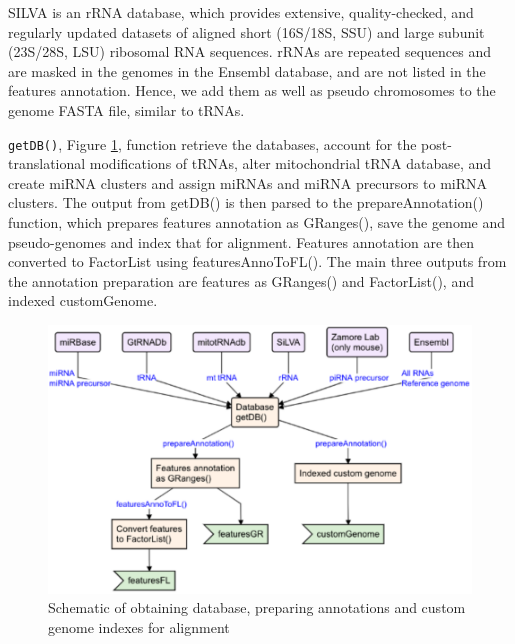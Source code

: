 \documentclass[12pt,twoside]{reedthesis}
\begin{document}
SILVA is an rRNA database, which provides extensive, quality-checked,
and regularly updated datasets of aligned short (16S/18S, SSU) and large
subunit (23S/28S, LSU) ribosomal RNA sequences. rRNAs are repeated
sequences and are masked in the genomes in the Ensembl database, and are
not listed in the features annotation. Hence, we add them as well as
pseudo chromosomes to the genome FASTA file, similar to tRNAs.

\texttt{getDB()}, Figure \ref{fig:3f6}, function retrieve the databases, account for the
post-translational modifications of tRNAs, alter mitochondrial tRNA
database, and create miRNA clusters and assign miRNAs and miRNA
precursors to miRNA clusters. The output from getDB() is then parsed to
the prepareAnnotation() function, which prepares features annotation as
GRanges(), save the genome and pseudo-genomes and index that for
alignment. Features annotation are then converted to FactorList using
featuresAnnoToFL(). The main three outputs from the annotation
preparation are features as GRanges() and FactorList(), and indexed
customGenome.


\begin{figure}[h]

{\centering \includegraphics{thesis_files/figure-latex/3f6-1} 

}

\caption{Schematic of obtaining database, preparing annotations and custom genome indexes for alignment}\label{fig:3f6}
\end{figure}
\end{document}

